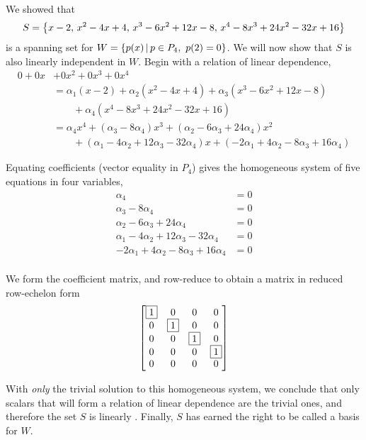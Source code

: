 \documentclass{ximera}
\begin{document}
\begin{example}
  We showed that
  \[
    S=\left\{x-2,\,x^2-4x+4,\,x^3-6x^2+12x-8,\,x^4-8x^3+24x^2-32x+16\right\}
  \]
  is a spanning set for $W=\left\lbrace p(x)\,\middle|\,p\in P_4,\ p(2)=0\right\rbrace$.  We
  will now show that $S$ is also linearly independent in $W$.  Begin
  with a relation of linear dependence,
  \begin{align*}
    0+0x&+0x^2+0x^3+0x^4\\
        &=\alpha_1\left(x-2\right)+\alpha_2\left(x^2-4x+4\right)+\alpha_3\left(x^3-6x^2+12x-8\right)\\
        &\quad\quad +\alpha_4\left(x^4-8x^3+24x^2-32x+16\right)\\
        &=\alpha_4x^4+
          \left(\alpha_3-8\alpha_4\right)x^3+
          \left(\alpha_2-6\alpha_3+24\alpha_4\right)x^2\\
        &\quad\quad +
          \left(\alpha_1-4\alpha_2+12\alpha_3-32\alpha_4\right)x+
          \left(-2\alpha_1+4\alpha_2-8\alpha_3+16\alpha_4\right)
  \end{align*}
  
  Equating coefficients (vector equality in $P_4$) gives the homogeneous system of five equations in four variables,
  \begin{align*}
    \alpha_4&=0\\
    \alpha_3-8\alpha_4&=0\\
    \alpha_2-6\alpha_3+24\alpha_4&=0\\
    \alpha_1-4\alpha_2+12\alpha_3-32\alpha_4&=0\\
    -2\alpha_1+4\alpha_2-8\alpha_3+16\alpha_4&=0\\
  \end{align*}

  We form the coefficient matrix, and row-reduce to obtain a matrix in reduced row-echelon form
  \[
    \begin{bmatrix}
      \fbox{1}&0&0&0\\
      0&\fbox{1}&0&0\\
      0&0&\fbox{1}&0\\
      0&0&0&\fbox{1}\\
      0&0&0&0
    \end{bmatrix}
  \]

  With \textit{only} the trivial solution to this homogeneous system,
  we conclude that only scalars that will form a relation of linear
  dependence are the trivial ones, and therefore the set $S$ is
  linearly
  .
  Finally, $S$ has earned the right to be called a basis for $W$.
\end{example}
\end{document}
